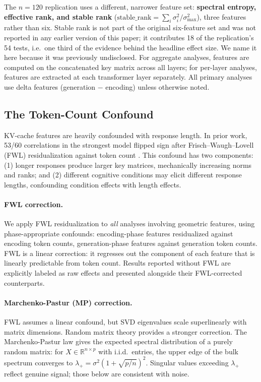 \documentclass[11pt,a4paper]{article}
\begin{document}
The $n{=}120$ replication uses a different,
narrower feature set: \textbf{spectral entropy, effective rank, and
stable rank} ($\text{stable\_rank} = \sum_i \sigma_i^2 / \sigma_{\max}^2$),
three features rather than six. Stable rank is not part of the original
six-feature set and was not reported in any earlier version of this
paper; it contributes 18 of the replication's 54 tests, i.e.\ one third of
the evidence behind the headline effect size. We name it here because it
was previously undisclosed. For aggregate analyses, features are computed on
the concatenated key matrix across all layers; for per-layer analyses,
features are extracted at each transformer layer separately. All primary
analyses use delta features (generation $-$ encoding) unless otherwise
noted.

\subsection{The Token-Count Confound}

KV-cache features are heavily confounded with response length. In prior
work, 53/60 correlations in the strongest model flipped sign after
Frisch--Waugh--Lovell (FWL) residualization
\citep{frisch1933partial,lovell1963seasonal} against token count
\citep{lyra2026campaign3}. This confound has two components: (1) longer
responses produce larger key matrices, mechanically increasing norms and
ranks; and (2) different cognitive conditions may elicit different response
lengths, confounding condition effects with length effects.

\paragraph{FWL correction.} We apply FWL residualization to \emph{all}
analyses involving geometric features, using phase-appropriate confounds:
encoding-phase features residualized against encoding token counts,
generation-phase features against generation token counts. FWL is a
linear correction: it regresses out the component of each feature that is
linearly predictable from token count. Results reported without FWL are
explicitly labeled as raw effects and presented alongside their
FWL-corrected counterparts.

\paragraph{Marchenko-Pastur (MP) correction.} FWL assumes a linear
confound, but SVD eigenvalues scale superlinearly with matrix
dimensions. Random matrix theory provides a stronger correction. The
Marchenko-Pastur law \citep{marchenko1967distribution} gives the
expected spectral distribution of a purely random matrix: for
$X \in \mathbb{R}^{n \times p}$ with i.i.d.\ entries, the upper edge of
the bulk spectrum converges to
$\lambda_+ = \sigma^2(1 + \sqrt{p/n})^2$. Singular values exceeding
$\lambda_+$ reflect genuine signal; those below are consistent with
noise.
\end{document}

